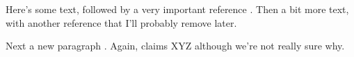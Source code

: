 \documentclass{article}
\begin{document}
Here's some text, followed by a very important reference
\cite<here I feel obligated to cite>[even though it's not really
necessary]{small}.  Then a bit more text, with another reference
\cite{small} that I'll probably remove later.

Next a new paragraph \cite{big}.  Again,  claims XYZ
although we're not really sure why.



\end{document}
